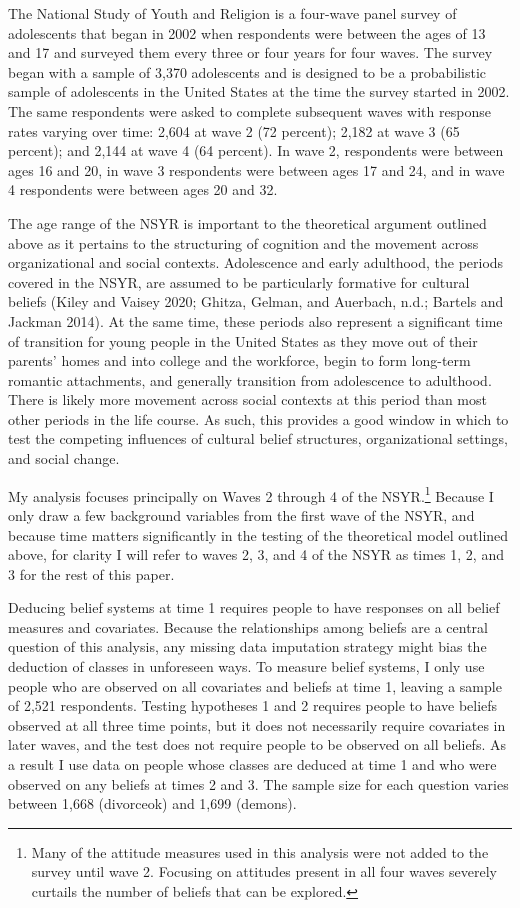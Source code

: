 \documentclass[12pt,]{article}
\begin{document}
The National Study of Youth and Religion is a four-wave panel survey of adolescents that began in 2002 when respondents were between the ages of 13 and 17 and surveyed them every three or four years for four waves. The survey began with a sample of 3,370 adolescents and is designed to be a probabilistic sample of adolescents in the United States at the time the survey started in 2002. The same respondents were asked to complete subsequent waves with response rates varying over time: 2,604 at wave 2 (72 percent); 2,182 at wave 3 (65 percent); and 2,144 at wave 4 (64 percent). In wave 2, respondents were between ages 16 and 20, in wave 3 respondents were between ages 17 and 24, and in wave 4 respondents were between ages 20 and 32.

The age range of the NSYR is important to the theoretical argument outlined above as it pertains to the structuring of cognition and the movement across organizational and social contexts. Adolescence and early adulthood, the periods covered in the NSYR, are assumed to be particularly formative for cultural beliefs (Kiley and Vaisey 2020; Ghitza, Gelman, and Auerbach, n.d.; Bartels and Jackman 2014). At the same time, these periods also represent a significant time of transition for young people in the United States as they move out of their parents' homes and into college and the workforce, begin to form long-term romantic attachments, and generally transition from adolescence to adulthood. There is likely more movement across social contexts at this period than most other periods in the life course. As such, this provides a good window in which to test the competing influences of cultural belief structures, organizational settings, and social change.

My analysis focuses principally on Waves 2 through 4 of the NSYR.\footnote{Many of the attitude measures used in this analysis were not added to the survey until wave 2. Focusing on attitudes present in all four waves severely curtails the number of beliefs that can be explored.} Because I only draw a few background variables from the first wave of the NSYR, and because time matters significantly in the testing of the theoretical model outlined above, for clarity I will refer to waves 2, 3, and 4 of the NSYR as times 1, 2, and 3 for the rest of this paper.

Deducing belief systems at time 1 requires people to have responses on all belief measures and covariates. Because the relationships among beliefs are a central question of this analysis, any missing data imputation strategy might bias the deduction of classes in unforeseen ways. To measure belief systems, I only use people who are observed on all covariates and beliefs at time 1, leaving a sample of 2,521 respondents. Testing hypotheses 1 and 2 requires people to have beliefs observed at all three time points, but it does not necessarily require covariates in later waves, and the test does not require people to be observed on all beliefs. As a result I use data on people whose classes are deduced at time 1 and who were observed on any beliefs at times 2 and 3. The sample size for each question varies between 1,668 (divorceok) and 1,699 (demons).
\end{document}
